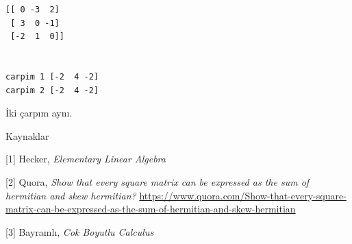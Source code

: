 \documentclass[12pt,fleqn]{article}\usepackage{../../common}
\begin{document}
\begin{verbatim}
[[ 0 -3  2]
 [ 3  0 -1]
 [-2  1  0]]


carpim 1 [-2  4 -2]
carpim 2 [-2  4 -2]
\end{verbatim}

İki çarpım aynı.


Kaynaklar

[1] Hecker, {\em Elementary Linear Algebra}

[2] Quora, {\em Show that every square matrix can be expressed as the sum of hermitian and skew hermitian?}
    \url{https://www.quora.com/Show-that-every-square-matrix-can-be-expressed-as-the-sum-of-hermitian-and-skew-hermitian}

[3] Bayramlı, {\em Cok Boyutlu Calculus}
\end{document}
